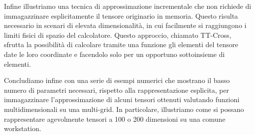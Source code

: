\documentclass[11pt,a4paper]{article}
\begin{document}
Infine illustriamo una tecnica di approssimazione incrementale che non richiede di immagazzinare esplicitamente il tensore originario in memoria. Questo risulta necessario in scenari di elevata dimensionalità, in cui facilmente si raggiungono i limiti fisici di spazio del calcolatore.
Questo approccio, chiamato TT-Cross, sfrutta la possibilità di calcolare tramite una funzione gli elementi del tensore date le loro coordinate e facendolo solo per un opportuno sottoinsieme di elementi.

Concludiamo infine con una serie di esempi numerici che mostrano il basso numero di parametri necessari, rispetto alla rappresentazione esplicita, per immagazzinare l'approssimazione di alcuni tensori ottenuti valutando funzioni multidimensionali su una multi-grid. In particolare, illustriamo come si possano rappresentare agevolmente tensori a 100 o 200 dimensioni su una comune workstation.
\end{document}

